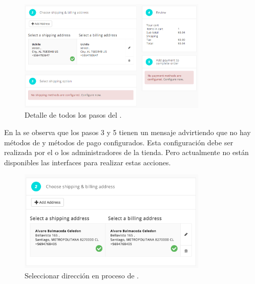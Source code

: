 	\begin{figure}[H]
		\centering
		\includegraphics[width=0.8\textwidth]{figuras/shipping/steps.png}
		\caption{Detalle de todos los pasos del \workflowCPT \shippingEF.}
		\label{figure:shipping:steps}
	\end{figure}

	En la  se observa que los pasos 3 y 5 tienen un mensaje advirtiendo que no hay métodos de \shippingEF y métodos de pago configurados. Esta configuración debe ser realizada por el o los administradores de la tienda. Pero actualmente no están disponibles las interfaces para realizar estas acciones.

	\begin{figure}[H]
		\centering
		\includegraphics[width=0.8\textwidth]{figuras/shipping/step_address.png}
		\caption{Seleccionar dirección en proceso de \shippingEF.}
		\label{figure:shipping:step_address}
	\end{figure}

